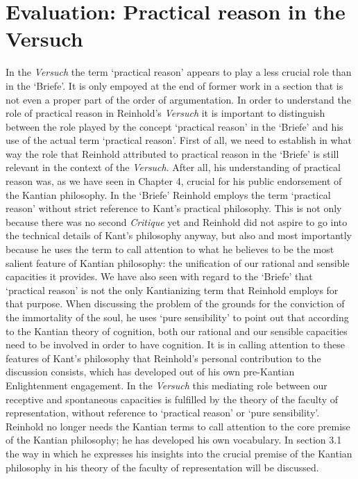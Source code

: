 \section{Evaluation: Practical reason in the Versuch }


In the \textit{Versuch} the term `practical reason' appears to play a less crucial role than in the `Briefe'. It is only empoyed at the end of former work in a section that is not even a proper part of the order of argumentation. In order to understand the role of practical reason in Reinhold's \textit{Versuch} it is important to distinguish between the role played by the concept `practical reason' in the `Briefe' and his use of the actual term `practical reason'. First of all, we need to establish in what way the role that Reinhold attributed to practical reason in the `Briefe' is still relevant in the context of the \textit{Versuch}. After all, his understanding of practical reason was, as we have seen in Chapter 4, crucial for his public endorsement of the Kantian philosophy. In the `Briefe' Reinhold employs the term `practical reason' without strict reference to Kant's practical philosophy. This is not only because there was no second \textit{Critique }yet and Reinhold did not aspire to go into the technical details of Kant's philosophy anyway, but also and most importantly because he uses the term to call attention to what he believes to be the most salient feature of Kantian philosophy: the unification of our rational and sensible capacities it provides. We have also seen with regard to the `Briefe' that `practical reason' is not the only Kantianizing term that Reinhold employs for that purpose. When discussing the problem of the grounds for the conviction of the immortality of the soul, he uses `pure sensibility' to point out that according to the Kantian theory of cognition, both our rational and our sensible capacities need to be involved in order to have cognition. It is in calling attention to these features of Kant's philosophy that Reinhold's personal contribution to the discussion consists, which has developed out of his own pre{-}Kantian Enlightenment engagement. In the \textit{Versuch }this mediating role between our receptive and spontaneous capacities is fulfilled by the theory of the faculty of representation, without reference to `practical reason' or `pure sensibility'. Reinhold no longer needs the Kantian terms to call attention to the core premise of the Kantian philosophy; he has developed his own vocabulary. In section 3.1 the way in which he expresses his insights into the crucial premise of the Kantian philosophy in his theory of the faculty of representation will be discussed. 

